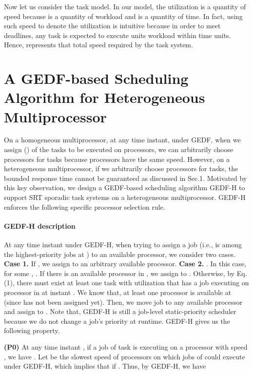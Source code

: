 \documentclass[Times, 10pt,twocolumn]{article}
\theoremstyle{definition}
\begin{document}
Now let us consider the task model. In our model, the utilization  is a quantity of speed because  is a quantity of workload and  is a quantity of time. In fact, using such speed to denote the utilization is intuitive because in order to meet deadlines, any task  is expected to execute  units workload within  time units. Hence,  represents that total speed required by the task system. 


\section{A GEDF-based Scheduling Algorithm for Heterogeneous Multiprocessor}
\label{sec:GEDF-H}
On a homogeneous multiprocessor, at any time instant, under GEDF,  when we assign  () of the  tasks to be executed on  processors, we can arbitrarily choose processors for tasks because processors have the same speed. However, on a heterogeneous multiprocessor, if we arbitrarily choose processors for tasks, the bounded response time cannot be guaranteed as discussed in Sec.1. Motivated by this key observation, we design a GEDF-based scheduling algorithm  GEDF-H to support SRT sporadic task systems on a heterogeneous multiprocessor. GEDF-H enforces the following specific processor selection rule.

\paragraph{GEDF-H description} At any time instant  under GEDF-H, when trying to assign a job (i.e.,  is among the  highest-priority jobs at ) to an available processor, we consider two cases. \textbf{Case 1.} If , we assign  to an arbitrary available processor. \textbf{Case 2.} . In this case, for some , . If there is an available processor  in , we assign  to . Otherwise, by Eq. (1), there must exist at least one task  with utilization  that has a job  executing on processor  in  at instant . We know that, at least one processor is available at  (since  has not been assigned yet). Then, we move job  to any available processor and assign  to . Note that, GEDF-H is still a job-level static-priority scheduler because we do not change a job's priority at runtime. GEDF-H gives us the following property.

\vspace{-1mm}
\begin{changemargin}{4mm}{4mm}
\textbf{(P0)} At any time instant , if a job  of task  is executing on a processor  with speed , we have . Let  be the slowest speed of processors on which jobs of  could execute under GEDF-H, which implies that  if . Thus, by GEDF-H, we have

\end{changemargin}
\vspace{-1mm}
\end{document}
